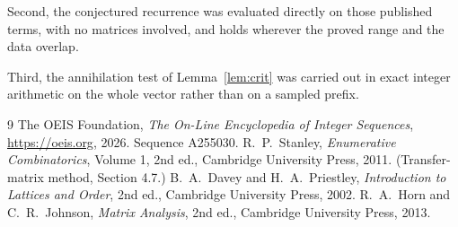 \documentclass[11pt,a4paper]{article}
\theoremstyle{plain}
\theoremstyle{definition}
\begin{document}
Second, the conjectured recurrence was evaluated directly on those published terms, with no
matrices involved, and holds wherever the proved range and the data overlap.

Third, the annihilation test of Lemma~\ref{lem:crit} was carried out in exact integer
arithmetic on the whole vector rather than on a sampled prefix.

\begin{thebibliography}{9}
 The OEIS Foundation, \emph{The On-Line Encyclopedia of Integer
Sequences}, \url{https://oeis.org}, 2026. Sequence A255030.
 R.~P.~Stanley, \emph{Enumerative Combinatorics}, Volume 1, 2nd ed.,
Cambridge University Press, 2011. (Transfer-matrix method, Section 4.7.)
 B.~A.~Davey and H.~A.~Priestley, \emph{Introduction to Lattices and
Order}, 2nd ed., Cambridge University Press, 2002.
 R.~A.~Horn and C.~R.~Johnson, \emph{Matrix Analysis}, 2nd ed., Cambridge
University Press, 2013.
\end{thebibliography}
\end{document}
